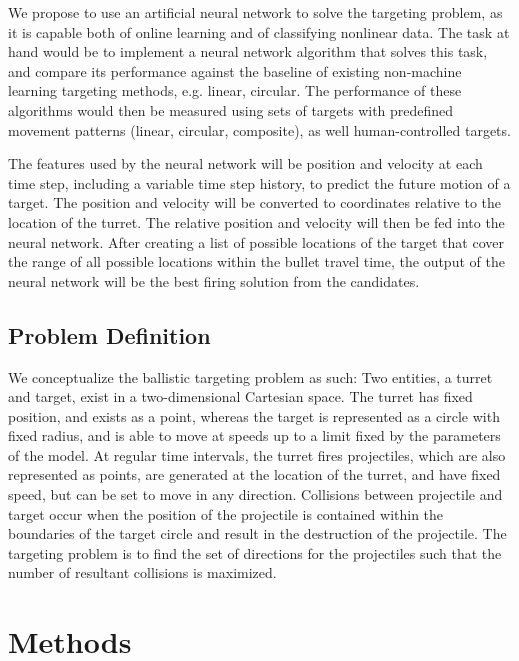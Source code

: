 \documentclass[11pt,letterpaper]{article}
\begin{document}
We propose to use an artificial neural network to solve the targeting problem, as it is capable both of online learning and of classifying nonlinear data. The task at hand would be to implement a neural network algorithm that solves this task, and compare its performance against the baseline of existing non-machine learning targeting methods, e.g. linear, circular. The performance of these algorithms would then be measured using sets of targets with predefined movement patterns (linear, circular, composite), as well human-controlled targets.

The features used by the neural network will be position and velocity at each time step, including a variable time step history, to predict the future motion of a target. The position and velocity will be converted to coordinates relative to the location of the turret. The relative position and velocity will then be fed into the neural network. After creating a list of possible locations of the target that cover the range of all possible locations within the bullet travel time, the output of the neural network will be the best firing solution from the candidates.

\subsection{Problem Definition}
We conceptualize the ballistic targeting problem as such:
Two entities, a turret and target, exist in a two-dimensional Cartesian space. The turret has fixed position, and exists as a point, whereas the target is represented as a circle with fixed radius, and is able to move at speeds up to a limit fixed by the parameters of the model. At regular time intervals, the turret fires projectiles, which are also represented as points, are generated at the location of the turret, and have fixed speed, but can be set to move in any direction. Collisions between projectile and target occur when the position of the projectile is contained within the boundaries of the target circle and result in the destruction of the projectile. The targeting problem is to find the set of directions for the projectiles such that the number of resultant collisions is maximized.
\section{Methods}
\end{document}
